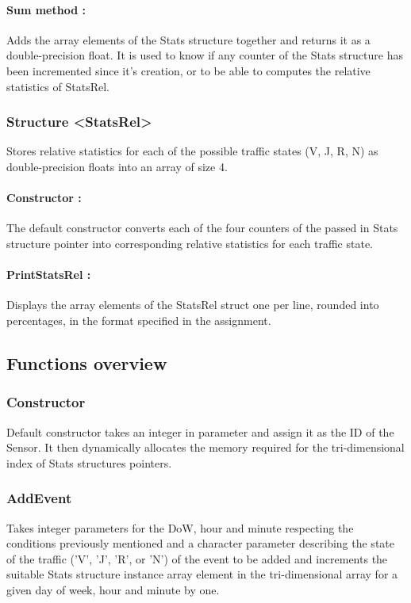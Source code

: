\documentclass[10pt]{article}
\begin{document}
\paragraph{Sum method :}
Adds the array elements of the Stats structure together and returns it as a double-precision float. It is used to know if any counter of the Stats structure has been incremented since it's creation, or to be able to computes the relative statistics of StatsRel.

\subsubsection*{Structure <StatsRel>}
Stores relative statistics for each of the possible traffic states (V, J, R, N) as double-precision floats into an array of size 4.

\paragraph{Constructor :}
The default constructor converts each of the four counters of the passed in Stats structure pointer into corresponding relative statistics for each traffic state.

\paragraph{PrintStatsRel :}
Displays the array elements of the StatsRel struct one per line, rounded into percentages, in the format specified in the assignment.

\subsection{Functions overview}

\subsubsection*{Constructor}
Default constructor takes an integer in parameter and assign it as the ID of the Sensor. It then dynamically allocates the memory required for the tri-dimensional index of Stats structures pointers.

\subsubsection*{AddEvent}
Takes integer parameters for the DoW, hour and minute respecting the conditions previously mentioned and a character parameter describing the state of the traffic ('V', 'J', 'R', or 'N') of the event to be added and increments the suitable Stats structure instance array element in the tri-dimensional array for a given day of week, hour and minute by one.
\end{document}
